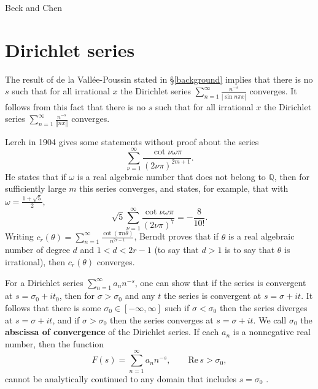 \documentclass{article}
\newcommand{\norm}[1]{\left\Vert #1 \right\Vert}
\def\Re{\ensuremath{\mathrm{Re}}\,}
\begin{document}
Beck and Chen \cite{irregularities}






\section{Dirichlet series}
\label{dirichlet}
The result of de la Vall\'ee-Poussin \cite{valleepoussin} stated in \S \ref{background} implies that there is no $s$ such that for all irrational $x$ the Dirichlet series
$\sum_{n=1}^\infty \frac{n^{-s}}{|\sin n\pi x|}$ converges. It follows from this fact that there is no $s$ such that for all irrational $x$ the Dirichlet series
$\sum_{n=1}^\infty \frac{n^{-s}}{\norm{nx}}$ converges.

Lerch \cite{comptes} in 1904 gives some statements without proof about the series
\[
\sum_{\nu=1}^\infty \frac{\cot \nu \omega \pi}{(2\nu \pi)^{2m+1}}.
\]
He states that if $\omega$ is a real algebraic number that does not belong to $\mathbb{Q}$, then for sufficiently
large $m$ this series converges, and states, for example, that
with $\omega=\frac{1+\sqrt{5}}{2}$,
\[
\sqrt{5} \sum_{\nu=1}^\infty \frac{\cot \nu \omega \pi}{(2\nu \pi)^7} = -\frac{8}{10!}.
\]
Writing $c_r(\theta)=\sum_{n=1}^\infty \frac{\cot(\pi n \theta)}{n^{2r-1}}$, Berndt \cite[p.~135, Theorem 5.1]{berndt}
proves that if $\theta$ is a real algebraic number of degree $d$ and $1<d<2r-1$ (to say that $d>1$ is to say that $\theta$ is irrational), then
$c_r(\theta)$ converges. 


For a Dirichlet series $\sum_{n=1}^\infty a_n n^{-s}$, one can show \cite[pp.~289--290, \S 9.11]{titchmarsh} that if the series is convergent at $s=\sigma_0+it_0$, then for $\sigma>\sigma_0$ and any  $t$ the series is convergent at $s=\sigma+it$. It follows that there is some $\sigma_0 \in [-\infty,\infty]$ such if $\sigma<\sigma_0$ then the series diverges at $s=\sigma+it$, and if $\sigma>\sigma_0$ then the series converges at $s=\sigma+it$. We call $\sigma_0$ the \textbf{abscissa of convergence} of the Dirichlet series. If each $a_n$ is a nonnegative real number, then 
the function
\[
F(s)=\sum_{n=1}^\infty a_n n^{-s}, \qquad \Re s>\sigma_0,
\]
cannot be analytically continued to any domain that includes $s=\sigma_0$ \cite[p.~101, Proposition~18]{schoiss}.
\end{document}
